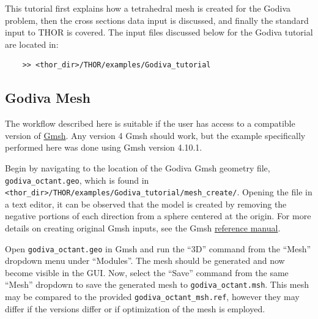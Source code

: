 This tutorial first explains how a tetrahedral mesh is created for the Godiva problem, then the cross sections data input is discussed, and finally the standard input to THOR is covered.
The input files discussed below for the Godiva tutorial are located in:
\begin{verbatim}
    >> <thor_dir>/THOR/examples/Godiva_tutorial
\end{verbatim}

\subsection{Godiva Mesh}

The workflow described here is suitable if the user has access to a compatible version of \href{https://gmsh.info/}{Gmsh}.
Any version 4 Gmsh should work, but the example specifically performed here was done using Gmsh version 4.10.1.

Begin by navigating to the location of the Godiva Gmsh geometry file, \verb"godiva_octant.geo", which is found in \verb"<thor_dir>/THOR/examples/Godiva_tutorial/mesh_create/".
Opening the file in a text editor, it can be observed that the model is created by removing the negative portions of each direction from a sphere centered at the origin.
For more details on creating original Gmsh inputs, see the Gmsh \href{https://gmsh.info/doc/texinfo/gmsh.html}{reference manual}.

Open \verb"godiva_octant.geo" in Gmsh and run the ``3D'' command from the ``Mesh'' dropdown menu under ``Modules''.
The mesh should be generated and now become visible in the GUI.
Now, select the ``Save'' command from the same ``Mesh'' dropdown to save the generated mesh to \verb"godiva_octant.msh".
This mesh may be compared to the provided \verb"godiva_octant_msh.ref", however they may differ if the versions differ or if optimization of the mesh is employed.

